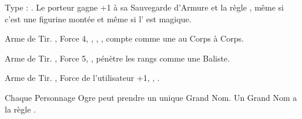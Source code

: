 \closearmyspecialrules

\vspace*{1.5cm}
\startarmyarmoury

\startitemlistonecol

\listitemonecol{\ironfist} Type : \pw{}. Le porteur gagne +1 à sa Sauvegarde d'Armure et la règle \parry{}, même si c'est une figurine montée et même si l'\ironfist{} est magique.

\listitemonecol{\braceofogrepistols} Arme de Tir. , Force 4, , , \quicktofire{}, compte comme une \pw{} au Corps à Corps.

\listitemonecol{\ogrecrossbow} Arme de Tir. , Force 5, , pénètre les rangs comme une Baliste.

\listitemonecol{\huntingspear} Arme de Tir. , Force de l'utilisateur +1, , \quicktofire{}.

\enditemlistonecol

\closearmyarmoury



\spaceaftersection{}

Chaque Personnage Ogre peut prendre un unique Grand Nom. Un Grand Nom a la règle \oneperarmy{}.

